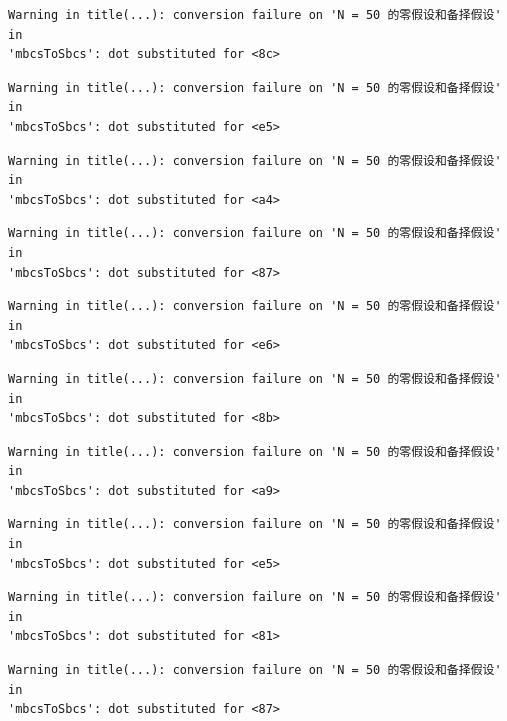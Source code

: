 \documentclass[
  letterpaper,
  DIV=11,
  numbers=noendperiod]{scrreprt}
\begin{document}
\begin{verbatim}
Warning in title(...): conversion failure on 'N = 50 的零假设和备择假设' in
'mbcsToSbcs': dot substituted for <8c>
\end{verbatim}

\begin{verbatim}
Warning in title(...): conversion failure on 'N = 50 的零假设和备择假设' in
'mbcsToSbcs': dot substituted for <e5>
\end{verbatim}

\begin{verbatim}
Warning in title(...): conversion failure on 'N = 50 的零假设和备择假设' in
'mbcsToSbcs': dot substituted for <a4>
\end{verbatim}

\begin{verbatim}
Warning in title(...): conversion failure on 'N = 50 的零假设和备择假设' in
'mbcsToSbcs': dot substituted for <87>
\end{verbatim}

\begin{verbatim}
Warning in title(...): conversion failure on 'N = 50 的零假设和备择假设' in
'mbcsToSbcs': dot substituted for <e6>
\end{verbatim}

\begin{verbatim}
Warning in title(...): conversion failure on 'N = 50 的零假设和备择假设' in
'mbcsToSbcs': dot substituted for <8b>
\end{verbatim}

\begin{verbatim}
Warning in title(...): conversion failure on 'N = 50 的零假设和备择假设' in
'mbcsToSbcs': dot substituted for <a9>
\end{verbatim}

\begin{verbatim}
Warning in title(...): conversion failure on 'N = 50 的零假设和备择假设' in
'mbcsToSbcs': dot substituted for <e5>
\end{verbatim}

\begin{verbatim}
Warning in title(...): conversion failure on 'N = 50 的零假设和备择假设' in
'mbcsToSbcs': dot substituted for <81>
\end{verbatim}

\begin{verbatim}
Warning in title(...): conversion failure on 'N = 50 的零假设和备择假设' in
'mbcsToSbcs': dot substituted for <87>
\end{verbatim}
\end{document}

